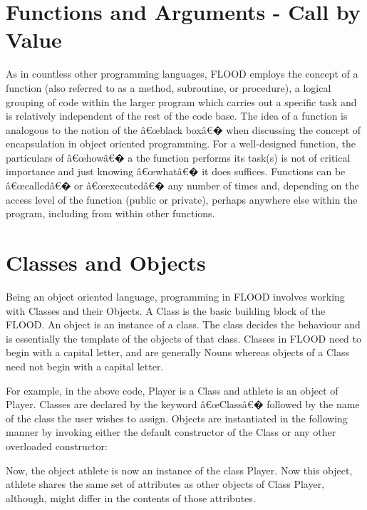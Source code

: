 \documentclass[12pt]{report}
\begin{document}
\section{Functions and Arguments - Call by Value}

\begin{doublespace}
As in countless other programming languages, FLOOD employs the concept of a function (also referred to as a method, subroutine, or procedure), a logical grouping of code within the larger program which carries out a specific task and is relatively independent of the rest of the code base. The idea of a function is analogous to the notion of the â€œblack boxâ€� when discussing the concept of encapsulation in object oriented programming. For a well-designed function, the particulars of â€œhowâ€� a the function performs its task(s) is not of critical importance and just knowing â€œwhatâ€� it does suffices. Functions can be â€œcalledâ€� or â€œexecutedâ€� any number of times and, depending on the access level of the function (public or private), perhaps anywhere else within the program, including from within other functions.
\end{doublespace}

\section{Classes and Objects}

\begin{doublespace}
Being an object oriented language, programming in FLOOD involves working with Classes and their Objects. A Class is the basic building block of the FLOOD. An object is an instance of a class. The class decides the behaviour and is essentially the template of the objects of that class. Classes in FLOOD need to begin with a capital letter, and are generally Nouns whereas objects of a Class need not begin with a capital letter. 
\end{doublespace}

\begin{doublespace}
For example, in the above code, Player is a Class and athlete is an object of Player.  Classes are declared by the keyword â€œClassâ€� followed by the name of the class the user wishes to assign. Objects are instantiated in the following manner by invoking either the default constructor of the Class or any other overloaded constructor:
\end{doublespace}

\begin{doublespace}
Now, the object athlete is now an instance of the class Player.  Now this object, athlete shares the same set of attributes as other objects of Class Player, although, might differ in the contents of those attributes.
\end{doublespace}
\end{document}
